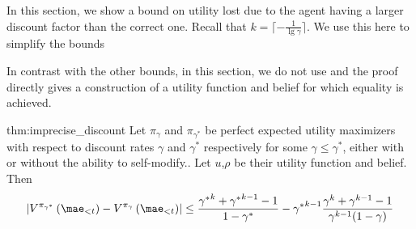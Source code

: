 In this section, we show a bound on utility lost due to the agent having a larger discount factor than the correct one. Recall that $k = \lceil - \frac{1}{\lg \gamma}\rceil$. We use this here to simplify the bounds

In contrast with the other bounds, in this section, we do not use  and the proof directly gives a construction of a utility function and belief for which equality is achieved. 

\begin{repeatthm}{thm:imprecise_discount}
Let $\pi_{\gamma}$ and $\pi_{\gamma^*}$ be perfect expected utility maximizers with respect to discount rates $\gamma$ and $\gamma^*$ respectively for some $\gamma \leq \gamma^*$, either with or without the ability to self-modify.. Let $u$,$\rho$ be their utility function and belief. Then 
\[
\left|V^{\pi_{\gamma^*}}\left(\mae_{<t}\right)-V^{\pi_{\gamma}}\left(\mae_{<t}\right)\right| \leq \frac{{\gamma^*}^{k} + {\gamma^*}^{k-1} - 1}{1-\gamma^*} - {\gamma^*}^{k-1}\frac{\gamma^{k} + \gamma^{k-1} - 1}{\gamma^{k-1}(1-\gamma)} 
\]
\end{repeatthm}

